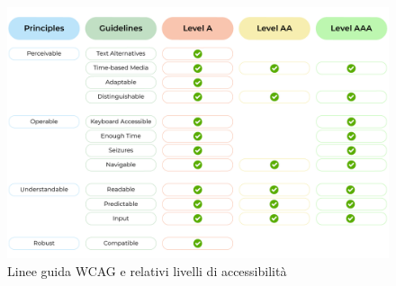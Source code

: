 \begin{figure}[H]
\centering
\includegraphics[scale=0.1]{res/wcag.png}
\caption{Linee guida WCAG e relativi livelli di accessibilità}
\label{fig:wcag}
\end{figure}

